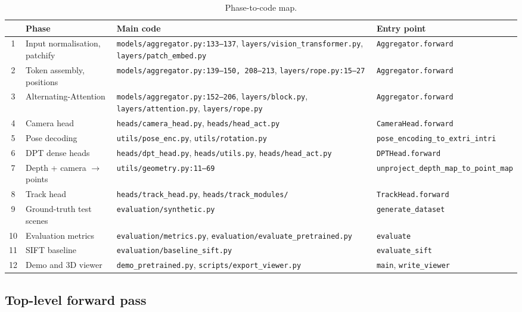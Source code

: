 \documentclass[11pt,a4paper]{article}
\newcommand{\src}[1]{\texttt{\small #1}}
\begin{document}
\begin{table}[htbp]
\centering
\caption{Phase-to-code map.}
\label{tab:files}
\footnotesize
\begin{tabular}{c>{\raggedright}p{3.2cm}>{\raggedright}p{6.6cm}>{\raggedright\arraybackslash}p{4.2cm}}
\toprule
& Phase & Main code & Entry point \\
\midrule
1 & Input normalisation, patchify & \src{models/aggregator.py:133--137}, \src{layers/vision\_transformer.py}, \src{layers/patch\_embed.py} & \texttt{Aggregator.forward} \\
2 & Token assembly, positions & \src{models/aggregator.py:139--150, 208--213}, \src{layers/rope.py:15--27} & \texttt{Aggregator.forward} \\
3 & Alternating-Attention & \src{models/aggregator.py:152--206}, \src{layers/block.py}, \src{layers/attention.py}, \src{layers/rope.py} & \texttt{Aggregator.forward} \\
4 & Camera head & \src{heads/camera\_head.py}, \src{heads/head\_act.py} & \texttt{CameraHead.forward} \\
5 & Pose decoding & \src{utils/pose\_enc.py}, \src{utils/rotation.py} & \texttt{pose\_encoding\_to\_\allowbreak extri\_intri} \\
6 & DPT dense heads & \src{heads/dpt\_head.py}, \src{heads/utils.py}, \src{heads/head\_act.py} & \texttt{DPTHead.forward} \\
7 & Depth + camera $\to$ points & \src{utils/geometry.py:11--69} & \texttt{unproject\_depth\_map\_\allowbreak to\_point\_map} \\
8 & Track head & \src{heads/track\_head.py}, \src{heads/track\_modules/} & \texttt{TrackHead.forward} \\
\midrule
9 & Ground-truth test scenes & \src{evaluation/synthetic.py} & \texttt{generate\_dataset} \\
10 & Evaluation metrics & \src{evaluation/metrics.py}, \src{evaluation/evaluate\_pretrained.py} & \texttt{evaluate} \\
11 & SIFT baseline & \src{evaluation/baseline\_sift.py} & \texttt{evaluate\_sift} \\
12 & Demo and 3D viewer & \src{demo\_pretrained.py}, \src{scripts/export\_viewer.py} & \texttt{main}, \texttt{write\_viewer} \\
\bottomrule
\end{tabular}
\end{table}

\subsection{Top-level forward pass}
\end{document}
